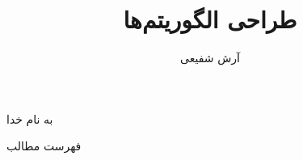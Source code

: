 \documentclass[aspectratio=169]{beamer}
\title{طراحی الگوریتم‌ها}
\author{
آرش شفیعی
}
\institute{
\\
\texttt{[image: logos/ui.png]}
}
\date{}
\begin{document}
\begin{frame}[plain]
\begin{center}
به نام خدا
\end{center}

\maketitle


\end{frame}
\setcounter{framenumber}{0}

%

\raggedleft

\begin{frame}{فهرست مطالب}
\begin{flushright}
  \tableofcontents
\end{flushright}
\end{frame}









%

%
%
\end{document}
